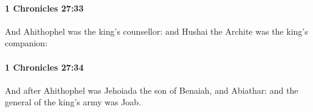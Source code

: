 		\paragraph{1 Chronicles 27:33} %
			\label{1CHRONICLES-27-33}

			And Ahithophel was the king’s counsellor: and Hushai the Archite was the king’s companion:


		\paragraph{1 Chronicles 27:34} %
			\label{1CHRONICLES-27-34}

			And after Ahithophel was Jehoiada the son of Benaiah, and Abiathar: and the general of the king’s army was Joab.


